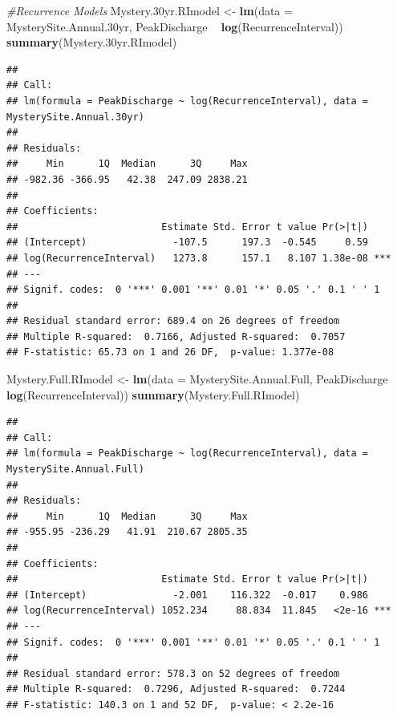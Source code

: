 \documentclass[]{article}
\newenvironment{Shaded}{\begin{snugshade}}{\end{snugshade}}
\newcommand{\CommentTok}[1]{\textcolor[rgb]{0.56,0.35,0.01}{\textit{#1}}}
\newcommand{\DataTypeTok}[1]{\textcolor[rgb]{0.13,0.29,0.53}{#1}}
\newcommand{\FloatTok}[1]{\textcolor[rgb]{0.00,0.00,0.81}{#1}}
\newcommand{\KeywordTok}[1]{\textcolor[rgb]{0.13,0.29,0.53}{\textbf{#1}}}
\newcommand{\NormalTok}[1]{#1}
\newcommand{\OperatorTok}[1]{\textcolor[rgb]{0.81,0.36,0.00}{\textbf{#1}}}
\newcommand{\StringTok}[1]{\textcolor[rgb]{0.31,0.60,0.02}{#1}}
\begin{document}
\begin{Shaded}
\begin{Highlighting}[]
\CommentTok{#Recurrence Models}
\NormalTok{Mystery}\FloatTok{.30}\NormalTok{yr.RImodel <-}\StringTok{ }\KeywordTok{lm}\NormalTok{(}\DataTypeTok{data =}\NormalTok{ MysterySite.Annual}\FloatTok{.30}\NormalTok{yr, PeakDischarge }\OperatorTok{~}\StringTok{ }\KeywordTok{log}\NormalTok{(RecurrenceInterval))}
\KeywordTok{summary}\NormalTok{(Mystery}\FloatTok{.30}\NormalTok{yr.RImodel)}
\end{Highlighting}
\end{Shaded}

\begin{verbatim}
## 
## Call:
## lm(formula = PeakDischarge ~ log(RecurrenceInterval), data = MysterySite.Annual.30yr)
## 
## Residuals:
##     Min      1Q  Median      3Q     Max 
## -982.36 -366.95   42.38  247.09 2838.21 
## 
## Coefficients:
##                         Estimate Std. Error t value Pr(>|t|)    
## (Intercept)               -107.5      197.3  -0.545     0.59    
## log(RecurrenceInterval)   1273.8      157.1   8.107 1.38e-08 ***
## ---
## Signif. codes:  0 '***' 0.001 '**' 0.01 '*' 0.05 '.' 0.1 ' ' 1
## 
## Residual standard error: 689.4 on 26 degrees of freedom
## Multiple R-squared:  0.7166, Adjusted R-squared:  0.7057 
## F-statistic: 65.73 on 1 and 26 DF,  p-value: 1.377e-08
\end{verbatim}

\begin{Shaded}
\begin{Highlighting}[]
\NormalTok{Mystery.Full.RImodel <-}\StringTok{ }\KeywordTok{lm}\NormalTok{(}\DataTypeTok{data =}\NormalTok{ MysterySite.Annual.Full, PeakDischarge }\OperatorTok{~}\StringTok{ }\KeywordTok{log}\NormalTok{(RecurrenceInterval))}
\KeywordTok{summary}\NormalTok{(Mystery.Full.RImodel)}
\end{Highlighting}
\end{Shaded}

\begin{verbatim}
## 
## Call:
## lm(formula = PeakDischarge ~ log(RecurrenceInterval), data = MysterySite.Annual.Full)
## 
## Residuals:
##     Min      1Q  Median      3Q     Max 
## -955.95 -236.29   41.91  210.67 2805.35 
## 
## Coefficients:
##                         Estimate Std. Error t value Pr(>|t|)    
## (Intercept)               -2.001    116.322  -0.017    0.986    
## log(RecurrenceInterval) 1052.234     88.834  11.845   <2e-16 ***
## ---
## Signif. codes:  0 '***' 0.001 '**' 0.01 '*' 0.05 '.' 0.1 ' ' 1
## 
## Residual standard error: 578.3 on 52 degrees of freedom
## Multiple R-squared:  0.7296, Adjusted R-squared:  0.7244 
## F-statistic: 140.3 on 1 and 52 DF,  p-value: < 2.2e-16
\end{verbatim}
\end{document}
